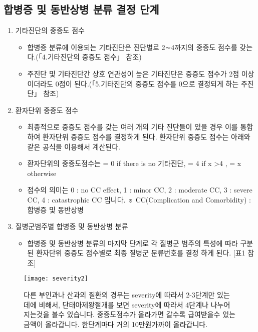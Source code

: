 \subsection{합병증 및 동반상병 분류 결정 단계}
\begin{enumerate}[(1)]\tightlist 
\item 기타진단의 중증도 점수
	\begin{itemize}\tightlist
	\item 합병증 분류에 이용되는 기타진단은 진단별로 2∼4까지의 중증도 점수를 갖는다.(「4.기타진단의 중증도 점수」 참조)
	\item 주진단 및 기타진단간 상호 연관성이 높은 기타진단은 중증도 점수가 2점 이상이더라도 0점이 된다.(「5.기타진단의 중증도 점수를 0으로 결정되게 하는 주진단」 참조)
	\end{itemize}
\item 환자단위 중증도 점수
	\begin{itemize}\tightlist
	\item 최종적으로 중증도 점수를 갖는 여러 개의 기타 진단들이 있을 경우 이를 통합하여 환자단위 중증도 점수를 결정하게 된다. 환자단위 중증도 점수는 아래와 같은 공식을 이용해서 계산된다.
	\item 환자단위의 중증도점수는  = 0 if there is no 기타진단, = 4 if x >4 , = x otherwise
	\item 점수의 의미는 0 : no CC effect, 1 : minor CC, 2 : moderate CC, 3 : severe CC, 4 : catastrophic CC 입니다. ※ CC(Complication and Comorbidity) : 합병증 및 동반상병
	\end{itemize}

\item 질병군범주별 합병증 및 동반상병 분류
	\begin{itemize}\tightlist
	\item 합병증 및 동반상병 분류의 마지막 단계로 각 질병군 범주의 특성에
따라 구분된 환자단위 중증도 점수별로 최종 질병군 분류번호를 결정
하게 된다. [표1 참조]
	\end{itemize}
\end{enumerate}

\begin{figure}
\centering
\texttt{[image: severity2]}	
\caption{다른 부인과나 산과의 질환의 경우는 severity에 따라서 2-3단계만 있는데에 비해서, 단태아제왕절개를 보면 severity에 따라서 4단계나 나누어 지는것을 볼수 있습니다. 중증도점수가 올라가면 갈수록 급여받을수 있는 금액이 올라갑니다. 한단계마다 거의 10만원가까이 올라갑니다.}
\end{figure}

